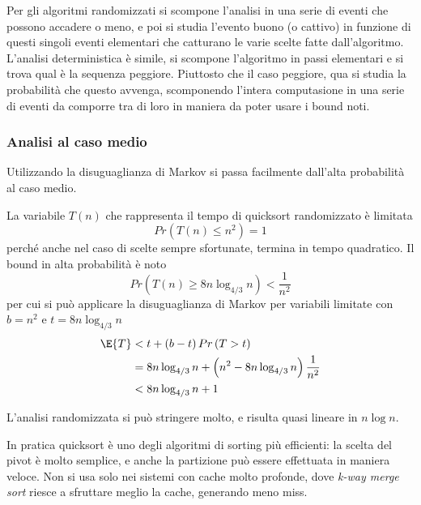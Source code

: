 Per gli algoritmi randomizzati si scompone l'analisi in una serie di eventi che possono accadere o meno,
e poi si studia l'evento buono (o cattivo) in funzione di questi singoli eventi elementari 
che catturano le varie scelte fatte dall'algoritmo.
L'analisi deterministica è simile, si scompone l'algoritmo in passi elementari e si trova qual è la sequenza peggiore.
Piuttosto che il caso peggiore, qua si studia la probabilità che questo avvenga,
scomponendo l'intera computasione in una serie di eventi da comporre tra di loro in maniera da poter usare i bound noti.

\subsubsection{Analisi al caso medio}

Utilizzando la disuguaglianza di Markov si passa facilmente dall'alta probabilità al caso medio.

La variabile $
T(n)
$ che rappresenta il tempo di quicksort randomizzato è limitata
\begin{equation*}
    Pr \left( 
        T(n) 
        \leq
        n^2
    \right)
    = 1
\end{equation*}
perché anche nel caso di scelte sempre sfortunate, termina in tempo quadratico. Il bound in alta probabilità è noto
\begin{equation*}
    Pr \left( 
        T(n)
        \geq
        8 n \log_{4/3} n
    \right)
    <
    \frac{1}{n^2}
\end{equation*}
per cui si può applicare la disuguaglianza di Markov per variabili limitate con $
b = n^2
$ e $
t = 
8 n \log_{4/3} n
$
\begin{align*}
    \E{T}
    &
    <
    t + \left( b-t \right) Pr \left( T > t \right)
    \\
    &= 
    8 n \log_{4/3} n
    +
    \left( 
        n^2
        -
        8 n \log_{4/3} n
    \right)
    \frac{1}{n^2}
    \\
    &<
    8 n \log_{4/3} n
    +1
\end{align*}

L'analisi randomizzata si può stringere molto, e risulta quasi lineare in $
n \log n
$.

In pratica quicksort è uno degli algoritmi di sorting più efficienti: la scelta del pivot è molto semplice, e anche la partizione può essere effettuata in maniera veloce.
Non si usa solo nei sistemi con cache molto profonde, dove \emph{k-way merge sort} riesce a sfruttare meglio la cache, generando meno miss.

